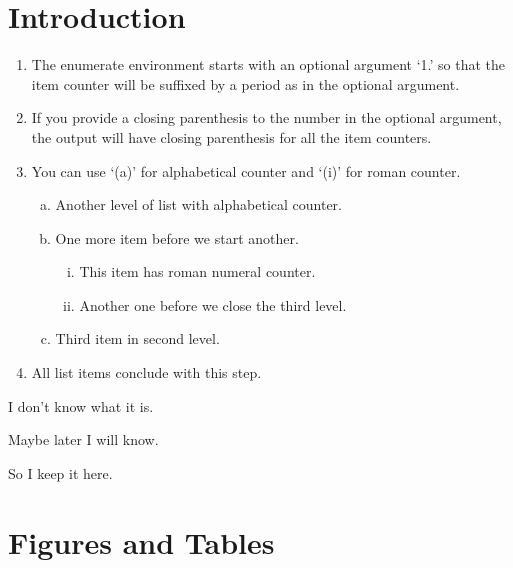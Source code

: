 \documentclass[a4paper,fleqn]{cas-dc}
\begin{document}
\maketitle

\section{Introduction}

\begin{enumerate}[1.]
  \item The enumerate environment starts with an optional argument `1.' so that the item counter will be suffixed by a period as in the optional argument.
  \item If you provide a closing parenthesis to the number in the optional argument, the output will have closing parenthesis for all the item counters.
  \item You can use `(a)' for alphabetical counter and `(i)' for roman counter.
  \begin{enumerate}[a)]
    \item Another level of list with alphabetical counter.
    \item One more item before we start another.
    \begin{enumerate}[(i)]
      \item This item has roman numeral counter.
      \item Another one before we close the third level.
    \end{enumerate}
    \item Third item in second level.
  \end{enumerate}
  \item All list items conclude with this step.
\end{enumerate}

\begin{description}
\item I don't know what it is.
\item Maybe later I will know.
\item So I keep it here.
\end{description}

\lipsum[2]\cite{NewmanGirvan2004}

\section{Figures and Tables}
\lipsum[3-4]
\end{document}

